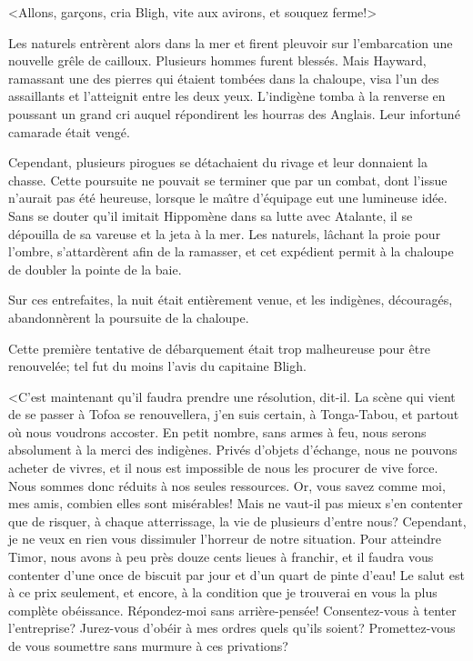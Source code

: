 <Allons, gar\c{c}ons, cria Bligh,
vite aux avirons, et souquez ferme!>

Les naturels entr\`erent alors dans la mer et firent
pleuvoir sur l'embarcation une nouvelle gr\^ele de
cailloux. Plusieurs hommes furent bless\'es. Mais Hayward,
ramassant une des pierres qui \'etaient tomb\'ees dans
la chaloupe, visa l'un des assaillants et l'atteignit
entre les deux yeux. L'indig\`ene tomba \`a la renverse
en poussant un grand cri auquel r\'epondirent les hourras
des Anglais. Leur infortun\'e camarade \'etait veng\'e.

Cependant, plusieurs pirogues se d\'etachaient du
rivage et leur donnaient la chasse. Cette poursuite
ne pouvait se terminer que par un combat, dont l'issue
n'aurait pas \'et\'e heureuse, lorsque le ma{\^\i}tre
d'\'equipage eut une lumineuse id\'ee.
Sans se douter qu'il imitait Hippom\`ene dans sa lutte
avec Atalante, il se d\'epouilla de sa vareuse et la jeta
\`a la mer. Les naturels, l\^achant la proie pour l'ombre,
s'attard\`erent afin de la ramasser, et cet exp\'edient
permit \`a la chaloupe de doubler la pointe de la baie.

Sur ces entrefaites, la nuit \'etait enti\`erement
venue, et les indig\`enes, d\'ecourag\'es,
abandonn\`erent la poursuite de la chaloupe.

Cette premi\`ere tentative de d\'ebarquement \'etait
trop mal\-heu\-reuse pour \^etre renouvel\'ee;
tel fut du moins l'avis du capitaine Bligh.

<C'est maintenant qu'il faudra prendre une r\'esolution,
dit-il. La sc\`ene qui vient de se passer \`a Tofoa
se renouvellera, j'en suis certain, \`a Tonga-Tabou,
et partout o\`u nous voudrons accoster. En petit nombre,
sans armes \`a feu, nous serons absolument \`a la
merci des indig\`enes. Priv\'es d'objets
d'\'echange, nous ne pouvons acheter de vivres,
et il nous est impossible de nous les procurer de vive force.
Nous sommes donc r\'eduits \`a nos seules
ressources. Or, vous savez comme moi, mes amis, combien
elles sont mis\'erables! Mais ne vaut-il pas mieux
s'en contenter que de risquer, \`a chaque atterrissage,
la vie de plusieurs d'entre nous? Cependant, je ne veux en
rien vous dissimuler l'horreur de notre situation.
Pour atteindre Timor, nous avons \`a peu pr\`es
douze cents lieues \`a franchir, et il faudra vous
contenter d'une once de biscuit par jour et d'un quart
de pinte d'eau! Le salut est \`a ce prix seulement,
et encore, \`a la condition que je trouverai en vous
la plus compl\`ete ob\'eissance.
R\'epondez-moi sans arri\`ere-pens\'ee!
Consentez-vous \`a tenter l'entreprise? 
Jurez-vous d'ob\'eir \`a mes ordres quels
qu'ils soient? Promettez-vous de vous soumettre
sans murmure \`a ces privations?

